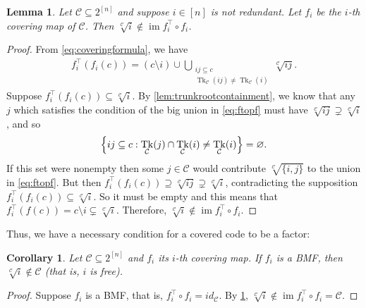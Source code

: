 \documentclass[11pt,letterpaper, reqno]{amsart}
\newtheorem{cor}[thm]{Corollary}     %
\newtheorem{lem}[thm]{Lemma}         %
\theoremstyle{definition}
\DeclareMathOperator{\im}{im}
\DeclareMathOperator{\tk}{Tk}
\def\cC{\mathcal{C}}
\begin{document}
        \begin{lem}\label{lem:norootinkernel}
            Let $\cC \subseteq 2^{[n]}$ and suppose $i \in [n]$ is not redundant.
            Let $f_i$ be the $i$-th covering map of $\cC$. Then $\sqrt[\cC]{i} \notin \im f_i^\top \circ f_i$.
        \end{lem}
        \begin{proof}
            From \eqref{eq:coveringformula}, we have
            \begin{align}
                f_i^\top(f_i(c)) = (c \setminus i) \cup \bigcup_{\substack{ij\subseteq c \\\tk_\cC(ij) \neq \tk_\cC(i)}} \sqrt[\cC]{ij}. \label{eq:ftopf}
            \end{align}
            Suppose $f_i^\top(f_i(c)) \subseteq \sqrt[\cC]{i}$.
            By \cref{lem:trunkrootcontainment}, we know that any $j$ which satisfies the condition of the big union in \eqref{eq:ftopf} must have $\sqrt[\cC]{ij} \supsetneq \sqrt[\cC]{i}$, and so
            \[ \Bigl\{ij \subseteq c : \tk_\cC(j) \cap \tk_\cC(i) \neq \tk_\cC(i)\Bigr\} = \varnothing. \]
            If this set were nonempty then some $j \in \cC$ would contribute $\sqrt[\cC]{\{i,j\}}$ to the union in \eqref{eq:ftopf}.
            But then $f_i^\top(f_i(c)) \supseteq \sqrt[\cC]{ij} \supsetneq \sqrt[\cC]{i}$, contradicting the supposition $f_i^\top(f_i(c)) \subseteq \sqrt[\cC]{i}$.
            So it must be empty and this means that $f_i^\top(f(c)) = c\setminus i \subsetneq \sqrt[\cC]{i}$.
            Therefore, $\sqrt[\cC]{i} \notin \im f_i^\top \circ f_i$.
        \end{proof}

        \noindent Thus, we have a necessary condition for a covered code to be a factor:

        \begin{cor}\label{cor:BMFimpliesfree}
            Let $\cC \subseteq 2^{[n]}$ and $f_i$ its $i$-th covering map. If $f_i$ is a BMF, then $\sqrt[\cC]{i} \notin \cC$ (that is, $i$ is free).
        \end{cor}
        \begin{proof}
            Suppose $f_i$ is a BMF, that is, $f_i^\top\circ f_i = id_\cC$. By \cref{lem:norootinkernel}, $\sqrt[\cC]{i} \notin \im f_i^\top \circ f_i = \cC$.
        \end{proof}
\end{document}
